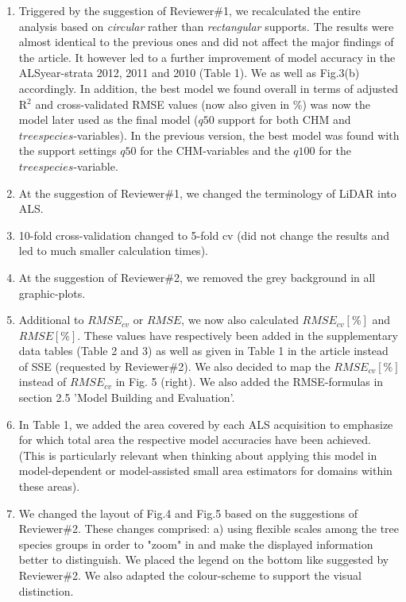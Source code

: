 \documentclass{article}
\begin{document}
\begin{enumerate}


\item Triggered by the suggestion of Reviewer\#1, we recalculated the entire analysis based on \textit{circular} rather than \textit{rectangular} supports. The results were almost identical to the previous ones and did not affect the major findings of the article. It however led to a further improvement of model accuracy in the ALSyear-strata 2012, 2011 and 2010 (Table 1). We  as well as Fig.3(b) accordingly. In addition, the best model we found overall in terms of adjusted R$^2$ and cross-validated RMSE values (now also given in \%) was now the model later used as the final model ($q50$ support for both CHM and $treespecies$-variables). In the previous version, the best model was found with the support settings $q50$ for the CHM-variables and the $q100$ for the $treespecies$-variable.

\item At the suggestion of Reviewer\#1, we changed the terminology of LiDAR into ALS.

\item 10-fold cross-validation changed to 5-fold cv (did not change the results and led to much smaller calculation times).

\item At the suggestion of Reviewer\#2, we removed the grey background in all graphic-plots.

\item Additional to $RMSE_{cv}$ or $RMSE$, we now also calculated $RMSE_{cv}[\%]$ and $RMSE[\%]$. These values have respectively been added in the supplementary data tables (Table 2 and 3) as well as given in Table 1 in the article instead of SSE (requested by Reviewer\#2). We also decided to map the $RMSE_{cv}[\%]$ instead of $RMSE_{cv}$ in Fig. 5 (right). We also added the RMSE-formulas in section 2.5 'Model Building and Evaluation'.

\item In Table 1, we added the area covered by each ALS acquisition to emphasize for which total area the respective model accuracies have been achieved. (This is particularly relevant when thinking about applying this model in model-dependent or model-assisted small area estimators for domains within these areas).


\item We changed the layout of Fig.4 and Fig.5 based on the suggestions of Reviewer\#2. These changes comprised: a) using flexible scales among the tree species groups in order to "zoom" in and make the displayed information better to distinguish. We placed the legend on the bottom like suggested by Reviewer\#2. We also adapted the colour-scheme to support the visual distinction.













\end{enumerate}



\end{document}
